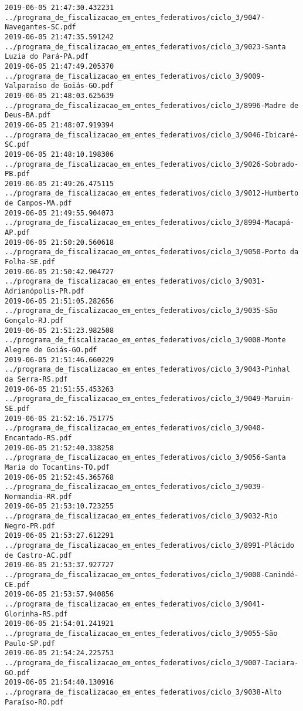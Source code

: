 \begin{lstlisting}
2019-06-05 21:47:30.432231 ../programa_de_fiscalizacao_em_entes_federativos/ciclo_3/9047-Navegantes-SC.pdf
2019-06-05 21:47:35.591242 ../programa_de_fiscalizacao_em_entes_federativos/ciclo_3/9023-Santa Luzia do Pará-PA.pdf
2019-06-05 21:47:49.205370 ../programa_de_fiscalizacao_em_entes_federativos/ciclo_3/9009-Valparaíso de Goiás-GO.pdf
2019-06-05 21:48:03.625639 ../programa_de_fiscalizacao_em_entes_federativos/ciclo_3/8996-Madre de Deus-BA.pdf
2019-06-05 21:48:07.919394 ../programa_de_fiscalizacao_em_entes_federativos/ciclo_3/9046-Ibicaré-SC.pdf
2019-06-05 21:48:10.198306 ../programa_de_fiscalizacao_em_entes_federativos/ciclo_3/9026-Sobrado-PB.pdf
2019-06-05 21:49:26.475115 ../programa_de_fiscalizacao_em_entes_federativos/ciclo_3/9012-Humberto de Campos-MA.pdf
2019-06-05 21:49:55.904073 ../programa_de_fiscalizacao_em_entes_federativos/ciclo_3/8994-Macapá-AP.pdf
2019-06-05 21:50:20.560618 ../programa_de_fiscalizacao_em_entes_federativos/ciclo_3/9050-Porto da Folha-SE.pdf
2019-06-05 21:50:42.904727 ../programa_de_fiscalizacao_em_entes_federativos/ciclo_3/9031-Adrianópolis-PR.pdf
2019-06-05 21:51:05.282656 ../programa_de_fiscalizacao_em_entes_federativos/ciclo_3/9035-São Gonçalo-RJ.pdf
2019-06-05 21:51:23.982508 ../programa_de_fiscalizacao_em_entes_federativos/ciclo_3/9008-Monte Alegre de Goiás-GO.pdf
2019-06-05 21:51:46.660229 ../programa_de_fiscalizacao_em_entes_federativos/ciclo_3/9043-Pinhal da Serra-RS.pdf
2019-06-05 21:51:55.453263 ../programa_de_fiscalizacao_em_entes_federativos/ciclo_3/9049-Maruim-SE.pdf
2019-06-05 21:52:16.751775 ../programa_de_fiscalizacao_em_entes_federativos/ciclo_3/9040-Encantado-RS.pdf
2019-06-05 21:52:40.338258 ../programa_de_fiscalizacao_em_entes_federativos/ciclo_3/9056-Santa Maria do Tocantins-TO.pdf
2019-06-05 21:52:45.365768 ../programa_de_fiscalizacao_em_entes_federativos/ciclo_3/9039-Normandia-RR.pdf
2019-06-05 21:53:10.723255 ../programa_de_fiscalizacao_em_entes_federativos/ciclo_3/9032-Rio Negro-PR.pdf
2019-06-05 21:53:27.612291 ../programa_de_fiscalizacao_em_entes_federativos/ciclo_3/8991-Plácido de Castro-AC.pdf
2019-06-05 21:53:37.927727 ../programa_de_fiscalizacao_em_entes_federativos/ciclo_3/9000-Canindé-CE.pdf
2019-06-05 21:53:57.940856 ../programa_de_fiscalizacao_em_entes_federativos/ciclo_3/9041-Glorinha-RS.pdf
2019-06-05 21:54:01.241921 ../programa_de_fiscalizacao_em_entes_federativos/ciclo_3/9055-São Paulo-SP.pdf
2019-06-05 21:54:24.225753 ../programa_de_fiscalizacao_em_entes_federativos/ciclo_3/9007-Iaciara-GO.pdf
2019-06-05 21:54:40.130916 ../programa_de_fiscalizacao_em_entes_federativos/ciclo_3/9038-Alto Paraíso-RO.pdf

\end{lstlisting}
